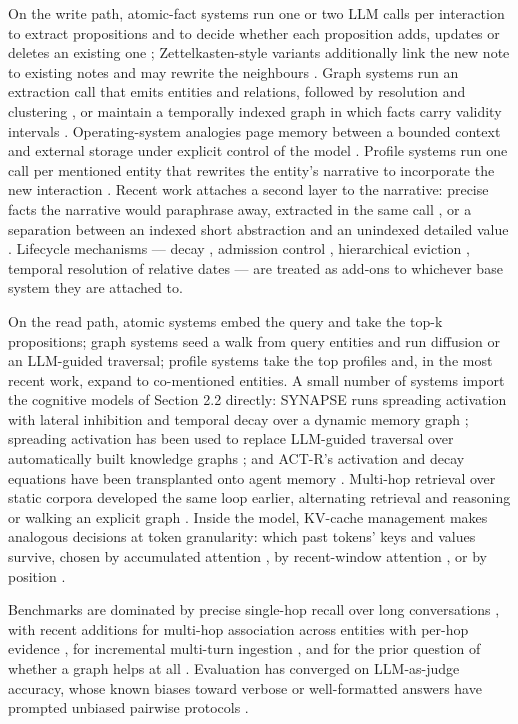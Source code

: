 \documentclass[11pt]{article}
\begin{document}
On the write path, atomic-fact systems run one or two LLM calls per interaction to extract propositions and to decide whether each proposition adds, updates or deletes an existing one \cite{mem0}; Zettelkasten-style variants additionally link the new note to existing notes and may rewrite the neighbours \cite{amem}. Graph systems run an extraction call that emits entities and relations, followed by resolution and clustering \cite{hipporag,graphrag}, or maintain a temporally indexed graph in which facts carry validity intervals \cite{zep}. Operating-system analogies page memory between a bounded context and external storage under explicit control of the model \cite{memgpt}. Profile systems run one call per mentioned entity that rewrites the entity's narrative to incorporate the new interaction \cite{prograph,ariadnemem}. Recent work attaches a second layer to the narrative: precise facts the narrative would paraphrase away, extracted in the same call \cite{prograph}, or a separation between an indexed short abstraction and an unindexed detailed value \cite{memora}. Lifecycle mechanisms --- decay \cite{fademem}, admission control \cite{amac}, hierarchical eviction \cite{evermemos}, temporal resolution of relative dates \cite{tsm} --- are treated as add-ons to whichever base system they are attached to.

On the read path, atomic systems embed the query and take the top-k propositions; graph systems seed a walk from query entities and run diffusion or an LLM-guided traversal; profile systems take the top profiles and, in the most recent work, expand to co-mentioned entities. A small number of systems import the cognitive models of Section 2.2 directly: SYNAPSE runs spreading activation with lateral inhibition and temporal decay over a dynamic memory graph \cite{synapse}; spreading activation has been used to replace LLM-guided traversal over automatically built knowledge graphs \cite{pavlovic2025}; and ACT-R's activation and decay equations have been transplanted onto agent memory \cite{honda2025}. Multi-hop retrieval over static corpora developed the same loop earlier, alternating retrieval and reasoning \cite{ircot,selfask,mdr} or walking an explicit graph \cite{tog,gretriever}. Inside the model, KV-cache management makes analogous decisions at token granularity: which past tokens' keys and values survive, chosen by accumulated attention \cite{h2o}, by recent-window attention \cite{snapkv}, or by position \cite{streamingllm}.

Benchmarks are dominated by precise single-hop recall over long conversations \cite{locomo,longmemeval}, with recent additions for multi-hop association across entities with per-hop evidence \cite{prograph}, for incremental multi-turn ingestion \cite{memoryagentbench}, and for the prior question of whether a graph helps at all \cite{graphragbench}. Evaluation has converged on LLM-as-judge accuracy, whose known biases toward verbose or well-formatted answers have prompted unbiased pairwise protocols \cite{benchmarkqed}.
\end{document}
